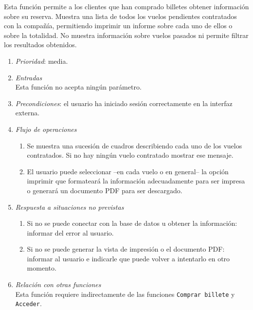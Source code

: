 	
	Esta función permite a los clientes que han comprado billetes obtener información sobre su reserva. Muestra una lista de todos los vuelos pendientes contratados con la compañía, permitiendo imprimir un informe sobre cada uno de ellos o sobre la totalidad. No muestra información sobre vuelos pasados ni permite filtrar los resultados obtenidos.

	\begin{enumerate}
		\item \textit{Prioridad}: media.
		\item \textit{Entradas}\\
			Esta función no acepta ningún parámetro.

		\item \textit{Precondiciones}: el usuario ha iniciado sesión correctamente en la interfaz externa.
		
		\item \textit{Flujo de operaciones}
			\begin{enumerate}
				\item Se muestra una sucesión de cuadros describiendo cada uno de los vuelos contratados. Si no hay ningún vuelo contratado mostrar ese mensaje.
				\item El usuario puede seleccionar --en cada vuelo o en general-- la opción imprimir que formateará la información adecuadamente para ser impresa o generará un documento \gls{PDF} para ser descargado.
			\end{enumerate}
		\item \textit{Respuesta a situaciones no previstas}
			\begin{enumerate}
				\item Si no se puede conectar con la base de datos u obtener la información: informar del error al usuario.
				\item Si no se puede generar la vista de impresión o el documento \gls{PDF}: informar al usuario e indicarle que puede volver a intentarlo en otro momento.
			\end{enumerate}
		\item \textit{Relación con otras funciones}\\
			Esta función requiere indirectamente de las funciones \verb|Comprar billete| y \verb|Acceder|.
	\end{enumerate}
